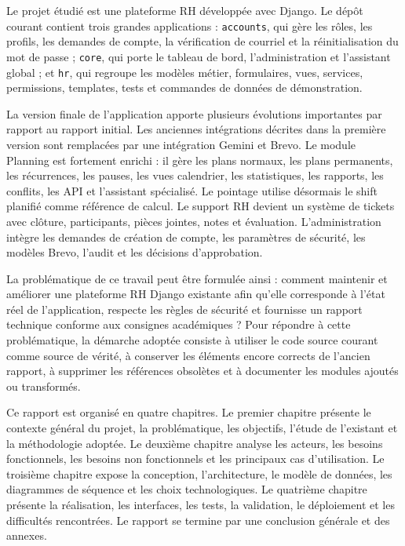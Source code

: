 \documentclass[12pt,a4paper]{report}
\begin{document}
Le projet étudié est une plateforme RH développée avec Django. Le dépôt courant contient trois grandes applications : \texttt{accounts}, qui gère les rôles, les profils, les demandes de compte, la vérification de courriel et la réinitialisation du mot de passe ; \texttt{core}, qui porte le tableau de bord, l'administration et l'assistant global ; et \texttt{hr}, qui regroupe les modèles métier, formulaires, vues, services, permissions, templates, tests et commandes de données de démonstration.

La version finale de l'application apporte plusieurs évolutions importantes par rapport au rapport initial. Les anciennes intégrations décrites dans la première version sont remplacées par une intégration Gemini et Brevo. Le module Planning est fortement enrichi : il gère les plans normaux, les plans permanents, les récurrences, les pauses, les vues calendrier, les statistiques, les rapports, les conflits, les API et l'assistant spécialisé. Le pointage utilise désormais le shift planifié comme référence de calcul. Le support RH devient un système de tickets avec clôture, participants, pièces jointes, notes et évaluation. L'administration intègre les demandes de création de compte, les paramètres de sécurité, les modèles Brevo, l'audit et les décisions d'approbation.

La problématique de ce travail peut être formulée ainsi : comment maintenir et améliorer une plateforme RH Django existante afin qu'elle corresponde à l'état réel de l'application, respecte les règles de sécurité et fournisse un rapport technique conforme aux consignes académiques ? Pour répondre à cette problématique, la démarche adoptée consiste à utiliser le code source courant comme source de vérité, à conserver les éléments encore corrects de l'ancien rapport, à supprimer les références obsolètes et à documenter les modules ajoutés ou transformés.

Ce rapport est organisé en quatre chapitres. Le premier chapitre présente le contexte général du projet, la problématique, les objectifs, l'étude de l'existant et la méthodologie adoptée. Le deuxième chapitre analyse les acteurs, les besoins fonctionnels, les besoins non fonctionnels et les principaux cas d'utilisation. Le troisième chapitre expose la conception, l'architecture, le modèle de données, les diagrammes de séquence et les choix technologiques. Le quatrième chapitre présente la réalisation, les interfaces, les tests, la validation, le déploiement et les difficultés rencontrées. Le rapport se termine par une conclusion générale et des annexes.
\end{document}
